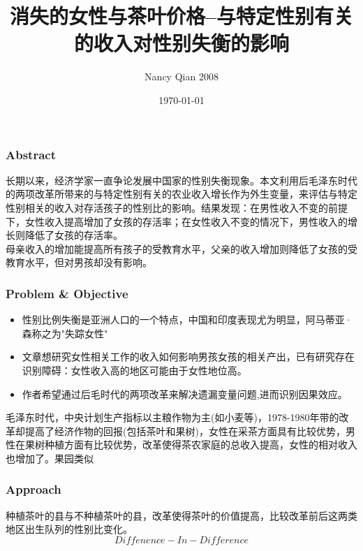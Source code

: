 \documentclass{beamer}
\title[文献分享:ZY]{消失的女性与茶叶价格--与特定性别有关的收入对性别失衡的影响}
\author[Nancy Qian 2008]{Nancy Qian	  2008}
\date{\today}
\begin{document}
\frame{\titlepage}



\begin{frame}
\frametitle{Abstract}
长期以来，经济学家一直争论发展中国家的性别失衡现象。本文利用后毛泽东时代的两项改革所带来的与特定性别有关的农业收入增长作为外生变量，来评估与特定性别相关的收入对存活孩子的性别比的影响。结果发现：在男性收入不变的前提下，女性收入提高增加了女孩的存活率；在女性收入不变的情况下，男性收入的增长则降低了女孩的存活率。
\\ 母亲收入的增加能提高所有孩子的受教育水平，父亲的收入增加则降低了女孩的受教育水平，但对男孩却没有影响。
\end{frame}


\begin{frame}
\frametitle{Problem \& Objective}
\begin{itemize}
 	\item 性别比例失衡是亚洲人口的一个特点，中国和印度表现尤为明显，阿马蒂亚·森称之为"失踪女性"
	\item 文章想研究女性相关工作的收入如何影响男孩女孩的相关产出，已有研究存在识别障碍：女性收入高的地区可能由于女性地位高。
	\item 作者希望通过后毛时代的两项改革来解决遗漏变量问题,进而识别因果效应。
\end{itemize}
毛泽东时代，中央计划生产指标以主粮作物为主(如小麦等)，1978-1980年带的改革却提高了经济作物的回报(包括茶叶和果树)，女性在采茶方面具有比较优势，男性在果树种植方面有比较优势，改革使得茶农家庭的总收入提高，女性的相对收入也增加了。果园类似
\end{frame}


\begin{frame}
\frametitle{Approach}

\par 种植茶叶的县与不种植茶叶的县，改革使得茶叶的价值提高，比较改革前后这两类地区出生队列的性别比变化。
$$Diffenence-In-Difference$$

\end{frame}
\end{document}
